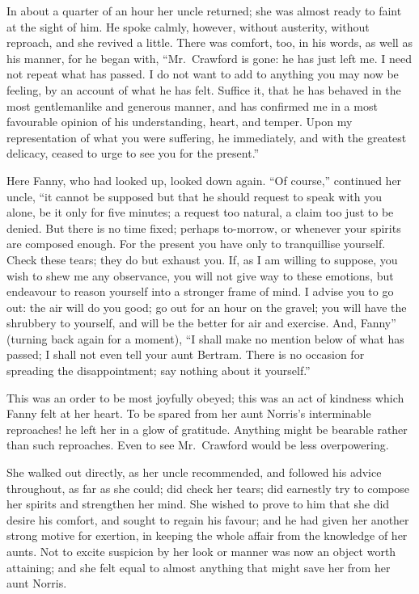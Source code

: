 \documentclass{article}
\begin{document}
In about a quarter of an hour her uncle returned;
she was almost ready to faint at the sight of him.
He spoke calmly, however, without austerity, without reproach,
and she revived a little.  There was comfort, too,
in his words, as well as his manner, for he began with,
``Mr.\ Crawford is gone:  he has just left me.  I need not
repeat what has passed.  I do not want to add to anything
you may now be feeling, by an account of what he has felt.
Suffice it, that he has behaved in the most gentlemanlike
and generous manner, and has confirmed me in a most
favourable opinion of his understanding, heart, and temper.
Upon my representation of what you were suffering,
he immediately, and with the greatest delicacy,
ceased to urge to see you for the present.''

Here Fanny, who had looked up, looked down again.  ``Of course,''
continued her uncle, ``it cannot be supposed but that he should
request to speak with you alone, be it only for five minutes;
a request too natural, a claim too just to be denied.
But there is no time fixed; perhaps to-morrow, or whenever
your spirits are composed enough.  For the present you
have only to tranquillise yourself.  Check these tears;
they do but exhaust you.  If, as I am willing to suppose,
you wish to shew me any observance, you will not give
way to these emotions, but endeavour to reason yourself
into a stronger frame of mind.  I advise you to go out:
the air will do you good; go out for an hour on the gravel;
you will have the shrubbery to yourself, and will be the
better for air and exercise.  And, Fanny'' (turning back
again for a moment), ``I shall make no mention below of
what has passed; I shall not even tell your aunt Bertram.
There is no occasion for spreading the disappointment;
say nothing about it yourself.''

This was an order to be most joyfully obeyed; this was
an act of kindness which Fanny felt at her heart.
To be spared from her aunt Norris's interminable
reproaches! he left her in a glow of gratitude.
Anything might be bearable rather than such reproaches.
Even to see Mr.\ Crawford would be less overpowering.

She walked out directly, as her uncle recommended,
and followed his advice throughout, as far as she could;
did check her tears; did earnestly try to compose her spirits
and strengthen her mind.  She wished to prove to him that she
did desire his comfort, and sought to regain his favour;
and he had given her another strong motive for exertion,
in keeping the whole affair from the knowledge of her aunts.
Not to excite suspicion by her look or manner was now
an object worth attaining; and she felt equal to almost
anything that might save her from her aunt Norris.
\end{document}
